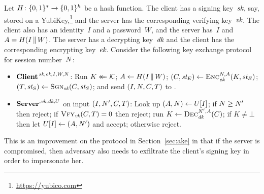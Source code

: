 %
%
%
\newcommand{\ek}{\varfont{ek}}
\newcommand{\dk}{\varfont{dk}}
\newcommand{\vk}{\varfont{vk}}
\label{sec:ake2f}
Let $H\colon\{0,1\}^* \to \{0,1\}^h$ be a hash function.
%
The client has a signing key~$\textit{sk}$, say, stored on a
YubiKey,\footnote{\url{https://yubico.com}} and the server has the
corresponding verifying key~$\vk$.
%
The client also has an identity~$I$ and a password~$W$, and the server has~$I$
and $A = H(I \, \| \, W)$.
%
The server has a decrypting key~$\dk$ and the client has the corresponding
encrypting key~$\ek$.
%
Consider the following key exchange protocol for session number~$N$:
\begin{itemize}
  \item $\cli^{\,\sk,\ek,I,W,\nonce}$:
    Run $K \mathrel{\leftarrow\mkern-14mu\leftarrow} \mathcal{K}$;
    $A \gets H(I \, \| \, W)$;
    $(\cipher, \st_E) \gets \Enc_\ek^{\nonce,\ad}(K, \st_E)$;
    $(T, \textit{st}_S) \gets \textsc{Sgn}_{\textit{sk}}(C, \textit{st}_S)$; and
    send $(I, N, C, T)$ to \srv.

  \item $\srv^{,\vk,\dk,U}$ on input $(I, N', C, T)$:
    Look up $(A, N) \gets U[I]$;
    if $N \geq N'$ then reject;
    if $\Vfy_\vk(C, T)=\false$ then reject;
    run $K \gets \Dec_\dk^{\nonce',\ad}(\cipher)$;
    if $K \ne \bot$ then let $U[I] \gets (A, N')$ and accept; otherwise
    reject.
\end{itemize}
%
This is an improvement on the protocol in Section~\ref{sec:ake} in that if the
server is compromised, then adversary also needs to exfiltrate the client's
signing key in order to impersonate her.
%
